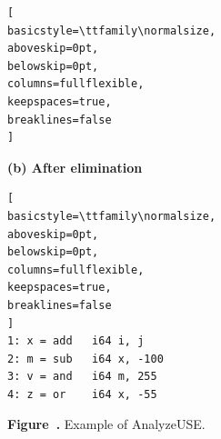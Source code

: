 \begin{center}
\begin{minipage}{0.90\textwidth}
\begin{minipage}[t]{0.46\linewidth}
\begin{lstlisting}[
basicstyle=\ttfamily\normalsize,
aboveskip=0pt,
belowskip=0pt,
columns=fullflexible,
keepspaces=true,
breaklines=false
]
\end{lstlisting}

\end{minipage}
\hfill
\begin{minipage}[t]{0.46\linewidth}
\raggedright

{\ttfamily\normalsize
\textbf{(b) After elimination}\par}

\begin{lstlisting}[
basicstyle=\ttfamily\normalsize,
aboveskip=0pt,
belowskip=0pt,
columns=fullflexible,
keepspaces=true,
breaklines=false
]
1: x = add   i64 i, j
2: m = sub   i64 x, -100
3: v = and   i64 m, 255
4: z = or    i64 x, -55

\end{lstlisting}

\end{minipage}

\end{minipage}
\end{center}

\label{fig:figure9}

\begin{center}
\small\textbf{Figure~\thefigure.} Example of AnalyzeUSE.
\end{center}

\par\vspace{1.2em}